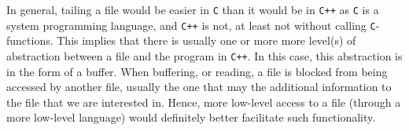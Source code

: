 In general, tailing a file would be easier in \texttt{C} than it would be in \texttt{C++} as \texttt{C} is a system programming language, and \texttt{C++} is not, at least not without calling \texttt{C}-functions. This implies that there is usually one or more more level(s) of abstraction between a file and the program in \texttt{C++}. In this case, this abstraction is in the form of a buffer. When buffering, or reading, a file is blocked from being accessed by another file, usually the one that may the additional information to the file that we are interested in. Hence, more low-level access to a file (through a more low-level language) would definitely better facilitate such functionality.
